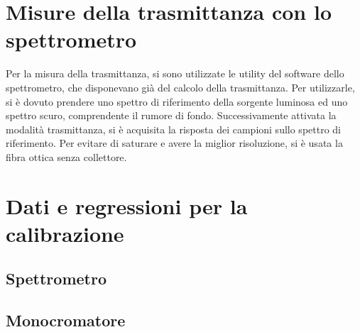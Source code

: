 \documentclass[11pt]{article} %
\begin{document}
\section{Misure della trasmittanza con lo spettrometro}
Per la misura della trasmittanza, si sono utilizzate le utility del software dello spettrometro, che disponevano già del calcolo della trasmittanza. Per utilizzarle, si è dovuto prendere uno spettro di riferimento della sorgente luminosa ed uno spettro scuro, comprendente il rumore di fondo. Successivamente attivata la modalità trasmittanza, si è acquisita la risposta dei campioni sullo spettro di riferimento. Per evitare di saturare e avere la miglior risoluzione, si è usata la fibra ottica senza collettore.
\section{Dati e regressioni per la calibrazione}
\subsection{Spettrometro}
\subsection{Monocromatore}
\end{document}
